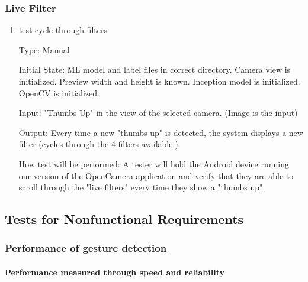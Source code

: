 \documentclass[12pt, titlepage]{article}
\begin{document}
\subsubsection{Live Filter}

\begin{enumerate}

\item{test-cycle-through-filters\\}

Type: Manual
					
Initial State: 
    ML model and label files in correct directory. Camera view is initialized. Preview width and height is known. Inception model is initialized. OpenCV is initialized. 
					
Input: "Thumbs Up" in the view of the selected camera. (Image is the input)
					
Output: Every time a new "thumbs up" is detected, the system displays a new filter (cycles through the 4 filters available.)
					
How test will be performed: A tester will hold the Android device running our version of the OpenCamera application and verify that they are able to scroll through the "live filters" every time they show a "thumbs up".

\end{enumerate}

\subsection{Tests for Nonfunctional Requirements}

\subsubsection{Performance of gesture detection}
		
\paragraph{Performance measured through speed and reliability}
\end{document}
